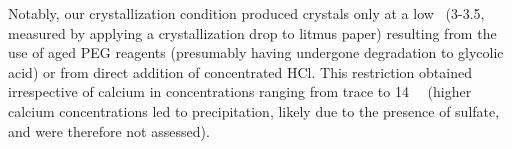 Notably, our crystallization condition produced crystals only at a low \pH\ (3-3.5, measured by applying a crystallization drop to litmus paper) resulting from the use of aged PEG reagents (presumably having undergone degradation to glycolic acid) or from direct addition of concentrated HCl. This restriction obtained irrespective of calcium in concentrations ranging from trace to \SI{14}{\milli\Molar} (higher calcium concentrations led to precipitation, likely due to the presence of sulfate, and were therefore not assessed). 

